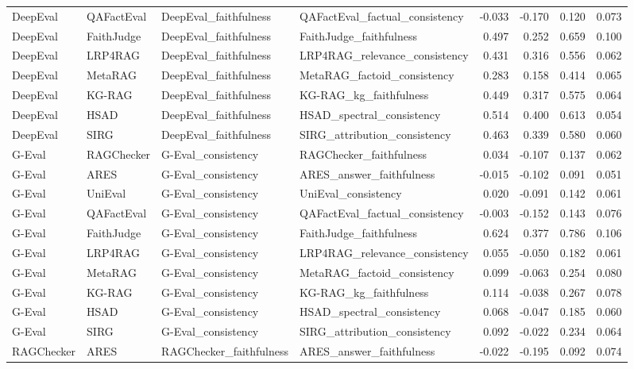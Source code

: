 \begin{table}
\begin{tabular}{llllrrrr}
DeepEval & QAFactEval & DeepEval_faithfulness & QAFactEval_factual_consistency & -0.033 & -0.170 & 0.120 & 0.073 \\
DeepEval & FaithJudge & DeepEval_faithfulness & FaithJudge_faithfulness & 0.497 & 0.252 & 0.659 & 0.100 \\
DeepEval & LRP4RAG & DeepEval_faithfulness & LRP4RAG_relevance_consistency & 0.431 & 0.316 & 0.556 & 0.062 \\
DeepEval & MetaRAG & DeepEval_faithfulness & MetaRAG_factoid_consistency & 0.283 & 0.158 & 0.414 & 0.065 \\
DeepEval & KG-RAG & DeepEval_faithfulness & KG-RAG_kg_faithfulness & 0.449 & 0.317 & 0.575 & 0.064 \\
DeepEval & HSAD & DeepEval_faithfulness & HSAD_spectral_consistency & 0.514 & 0.400 & 0.613 & 0.054 \\
DeepEval & SIRG & DeepEval_faithfulness & SIRG_attribution_consistency & 0.463 & 0.339 & 0.580 & 0.060 \\
G-Eval & RAGChecker & G-Eval_consistency & RAGChecker_faithfulness & 0.034 & -0.107 & 0.137 & 0.062 \\
G-Eval & ARES & G-Eval_consistency & ARES_answer_faithfulness & -0.015 & -0.102 & 0.091 & 0.051 \\
G-Eval & UniEval & G-Eval_consistency & UniEval_consistency & 0.020 & -0.091 & 0.142 & 0.061 \\
G-Eval & QAFactEval & G-Eval_consistency & QAFactEval_factual_consistency & -0.003 & -0.152 & 0.143 & 0.076 \\
G-Eval & FaithJudge & G-Eval_consistency & FaithJudge_faithfulness & 0.624 & 0.377 & 0.786 & 0.106 \\
G-Eval & LRP4RAG & G-Eval_consistency & LRP4RAG_relevance_consistency & 0.055 & -0.050 & 0.182 & 0.061 \\
G-Eval & MetaRAG & G-Eval_consistency & MetaRAG_factoid_consistency & 0.099 & -0.063 & 0.254 & 0.080 \\
G-Eval & KG-RAG & G-Eval_consistency & KG-RAG_kg_faithfulness & 0.114 & -0.038 & 0.267 & 0.078 \\
G-Eval & HSAD & G-Eval_consistency & HSAD_spectral_consistency & 0.068 & -0.047 & 0.185 & 0.060 \\
G-Eval & SIRG & G-Eval_consistency & SIRG_attribution_consistency & 0.092 & -0.022 & 0.234 & 0.064 \\
RAGChecker & ARES & RAGChecker_faithfulness & ARES_answer_faithfulness & -0.022 & -0.195 & 0.092 & 0.074 \\

\end{tabular}
\end{table}
